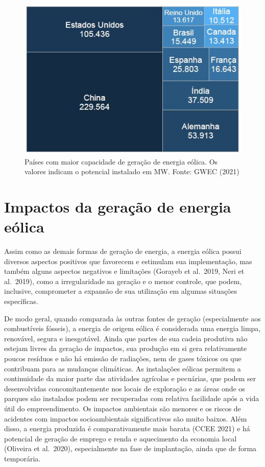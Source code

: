 \documentclass[
  oneside]{scrbook}
\begin{document}
\begin{figure}[H]

{\centering \includegraphics[width=0.7\linewidth]{imagens/cap01/Figura_1.7} 

}

\caption{Países com maior capacidade de geração de energia eólica. Os valores indicam o potencial instalado em MW. Fonte: GWEC (2021)}\label{fig:07}
\end{figure}

\hypertarget{impactos-da-gerauxe7uxe3o-de-energia-euxf3lica}{%
\section{Impactos da geração de energia eólica}\label{impactos-da-gerauxe7uxe3o-de-energia-euxf3lica}}

Assim como as demais formas de geração de energia, a energia eólica possui diversos aspectos positivos que favorecem e estimulam sua implementação, mas também alguns aspectos negativos e limitações (Gorayeb et al.~2019, Neri et al.~2019), como a irregularidade na geração e o menor controle, que podem, inclusive, comprometer a expansão de sua utilização em algumas situações específicas.

De modo geral, quando comparada às outras fontes de geração (especialmente aos combustíveis fósseis), a energia de origem eólica é considerada uma energia limpa, renovável, segura e inesgotável. Ainda que partes de sua cadeia produtiva não estejam livres da geração de impactos, sua produção em si gera relativamente poucos resíduos e não há emissão de radiações, nem de gases tóxicos ou que contribuam para as mudanças climáticas. As instalações eólicas permitem a continuidade da maior parte das atividades agrícolas e pecuárias, que podem ser desenvolvidas concomitantemente nos locais de exploração e as áreas onde os parques são instalados podem ser recuperadas com relativa facilidade após a vida útil do empreendimento. Os impactos ambientais são menores e os riscos de acidentes com impactos socioambientais significativos são muito baixos. Além disso, a energia produzida é comparativamente mais barata (CCEE 2021) e há potencial de geração de emprego e renda e aquecimento da economia local (Oliveira et al.~2020), especialmente na fase de implantação, ainda que de forma temporária.
\end{document}

